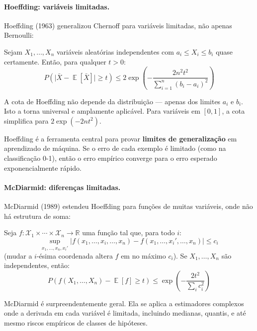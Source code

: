 \documentclass{tufte-handout}
\DeclareMathOperator{\E}{\mathbb{E}}
\begin{document}
\paragraph{Hoeffding: variáveis limitadas.}

Hoeffding (1963) generalizou Chernoff para variáveis limitadas, não apenas Bernoulli:

\begin{thm}
    Sejam $X_1, \dots, X_n$ variáveis aleatórias independentes com $a_i \le X_i \le b_i$ quase certamente. Então, para qualquer $t > 0$:
    \[
    P\!\left(\big|\bar{X} - \E[\bar{X}]\big| \ge t\right) \le 2\exp\!\left(-\frac{2n^2 t^2}{\sum_{i=1}^n (b_i - a_i)^2}\right)
    \]
\end{thm}

A cota de Hoeffding não depende da distribuição --- apenas dos limites $a_i$ e $b_i$. Isto a torna universal e amplamente aplicável. Para variáveis em $[0,1]$, a cota simplifica para $2\exp(-2nt^2)$.

\begin{remark}
    Hoeffding é a ferramenta central para provar \textbf{limites de generalização} em aprendizado de máquina. Se o erro de cada exemplo é limitado (como na classificação 0-1), então o erro empírico converge para o erro esperado exponencialmente rápido.
\end{remark}

\paragraph{McDiarmid: diferenças limitadas.}

McDiarmid (1989) estendeu Hoeffding para funções de muitas variáveis, onde não há estrutura de soma:

\begin{thm}
    Seja $f: \mathcal{X}_1 \times \cdots \times \mathcal{X}_n \to \mathbb{R}$ uma função tal que, para todo $i$:
    \[
    \sup_{x_1, \dots, x_n, x_i'} |f(x_1, \dots, x_i, \dots, x_n) - f(x_1, \dots, x_i', \dots, x_n)| \le c_i
    \]
    (mudar a $i$-ésima coordenada altera $f$ em no máximo $c_i$). Se $X_1, \dots, X_n$ são independentes, então:
    \[
    P\!\left(f(X_1, \dots, X_n) - \E[f] \ge t\right) \le \exp\!\left(-\frac{2t^2}{\sum_i c_i^2}\right)
    \]
\end{thm}

McDiarmid é surpreendentemente geral. Ela se aplica a estimadores complexos onde a derivada em cada variável é limitada, incluindo medianas, quantis, e até mesmo riscos empíricos de classes de hipóteses.
\end{document}
